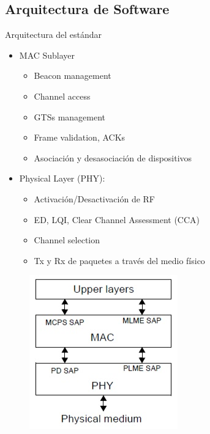 \documentclass[aspectratio=169, handout]{beamer}
\begin{document}
\subsection[Arquitectura]{Arquitectura de Software}
\begin{frame}{Arquitectura del estándar}

\begin{minipage}[c]{1.0\linewidth}
	\begin{minipage}[c]{0.6\linewidth}
		\begin{itemize}
			\item MAC Sublayer
			\begin{itemize}
				\item Beacon management
				\item Channel access
				\item GTSs management
				\item Frame validation, ACKs
				\item Asociación y desasociación de dispositivos
			\end{itemize}
			\vspace{10px}
			\item Physical Layer (PHY):
			\begin{itemize}
				\item Activación/Desactivación de RF
				\item ED, LQI, Clear Channel Assessment (CCA)
				\item Channel selection
				\item Tx y Rx de paquetes a través del medio físico
			\end{itemize}
			\vspace{10px}
		\end{itemize}	
	  \end{minipage}
	  \begin{minipage}[c]{0.35\linewidth}
		\begin{figure}[H]
			{\includegraphics[width=.6\textwidth]{./imagenes/arquitectura}}
		\end{figure}	  	  	
	  \end{minipage}
\end{minipage}

\end{frame}
\end{document}
